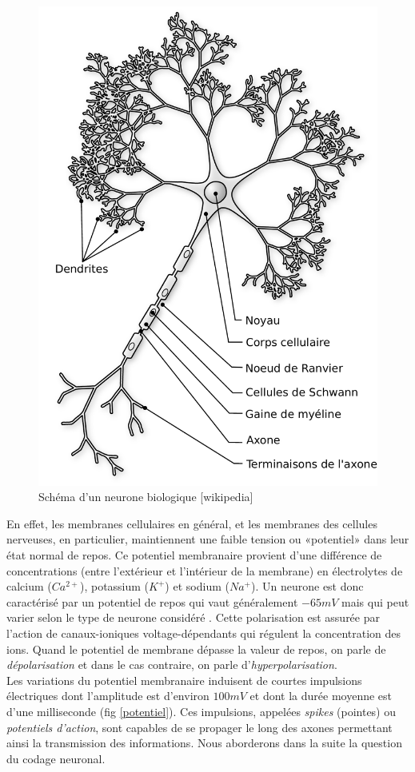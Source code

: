 \begin{figure}[htbp]
\begin{center}
\includegraphics[height=0.5\textwidth]{figures/ch1_1_neurone}
\end{center}
\caption{Schéma d'un neurone biologique [wikipedia]}
\label{neurone}
\end{figure}

En effet, les membranes cellulaires en général, et les membranes des cellules nerveuses, en particulier, maintiennent une faible tension ou «potentiel» dans leur état normal de repos. Ce potentiel membranaire provient d'une différence de concentrations (entre l'extérieur et l'intérieur de la membrane) en électrolytes de calcium ($Ca^{2+}$), potassium ($K^{+}$) et sodium ($Na^{+}$). Un neurone est donc caractérisé par un potentiel de repos qui vaut généralement $-65mV$ mais qui peut varier selon le type de neurone considéré \cite{Kandel:2000}. Cette polarisation est assurée par l'action de canaux-ioniques voltage-dépendants qui régulent la concentration des ions. Quand le potentiel de membrane dépasse la valeur de repos, on parle de \textit{dépolarisation} et dans le cas contraire, on parle d'\textit{hyperpolarisation}. \\

Les variations du potentiel membranaire induisent de courtes impulsions électriques dont l'amplitude est d'environ $100mV$ et dont la durée moyenne est d'une milliseconde (fig \ref{potentiel}). Ces impulsions, appelées \textit{spikes} (pointes) ou \textit{potentiels d'action}, sont capables de se propager le long des axones permettant ainsi la transmission des informations. Nous aborderons dans la suite la question du codage neuronal. \\

